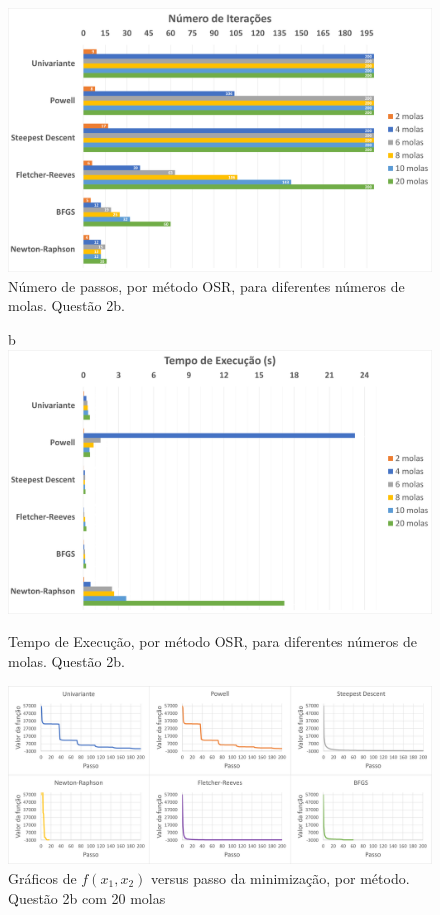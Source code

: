 \documentclass[10pt, a4paper]{article}
\begin{document}
\begin{figure}[H]
  \centering
  \includegraphics[scale=0.4]{figuras/q2b_passos.png}
  \caption{Número de passos, por método OSR, para diferentes números de molas. Questão 2b.}
\end{figure}

\begin{figure}[H]b
  \centering
  \includegraphics[scale=0.4]{figuras/q2b_tempo.png}
  \caption{Tempo de Execução, por método OSR, para diferentes números de molas. Questão 2b.}
\end{figure}

\begin{figure}[H]
  \centering
  \includegraphics[scale=0.45]{figuras/q2b_fxpassos_20molas.PNG}
  \caption{Gráficos de $f(x_1,x_2)$ versus passo da minimização, por método. Questão 2b com 20 molas}
\end{figure}
\end{document}
